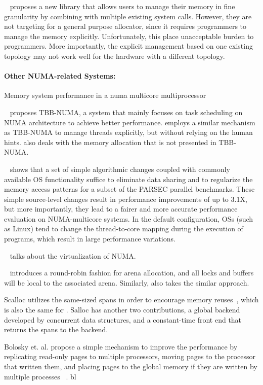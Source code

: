 ~\cite{cantalupo2015memkind} proposes a new library that allows users to manage their memory in fine granularity by combining with multiple existing system calls. However, they are not targeting for a general purpose allocator, since it requires programmers to manage the memory explicitly. Unfortunately, this place unacceptable burden to programmers. More importantly, the explicit management based on one existing topology may not work well for the hardware with a different topology. 



\paragraph{Other NUMA-related Systems:} 

Memory system performance in a numa multicore multiprocessor

~\cite{Majo:2015:LPC:2688500.2688509} proposes TBB-NUMA, a system that mainly focuses on task scheduling on NUMA architecture to achieve better performance. \NM{} employs a similar mechanism as TBB-NUMA to manage threads explicitly, but without relying on the human hints. \NM{} also deals with the memory allocation that is not presented in TBB-NUMA. 

~\cite{6704666} shows that a set of simple algorithmic changes coupled with commonly available OS functionality suffice to eliminate data sharing and to regularize the memory access patterns for a subset of the PARSEC parallel benchmarks. These simple source-level changes result in performance improvements of up to 3.1X, but more importantly, they lead to a fairer and more accurate performance evaluation on NUMA-multicore systems. In the default
configuration, OSs (such as Linux) tend to change the thread-to-core mapping during the execution of programs, which result in large performance variations.

~\cite{Bui:2019:EPV:3302424.3303960} talks about the virtualization of NUMA.

~\cite{jemalloc} introduces a round-robin fashion for arena allocation, and all locks and buffers will be local to the associated arena. Similarly, \NM{} also takes the similar approach. 

Scalloc utilizes the same-sized spans in order to encourage memory reuses~\cite{Scalloc}, which is also the same for \NM{}. Salloc has another two contributions, a global backend developed by concurrent data structures, and a constant-time front end that returns the spans to the backend. 

Bolosky et. al. propose a simple mechanism to improve the performance by replicating read-only pages to multiple processors, moving pages to the processor that written them, and placing pages to the global memory if they are written by multiple processes ~\cite{Bolosky:1989:SBE:74850.74854}. bl

